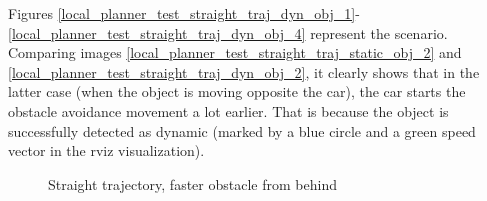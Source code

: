 Figures \ref{local_planner_test_straight_traj_dyn_obj_1}-\ref{local_planner_test_straight_traj_dyn_obj_4} represent the scenario. Comparing images \ref{local_planner_test_straight_traj_static_obj_2} and \ref{local_planner_test_straight_traj_dyn_obj_2}, it clearly shows that in the latter case (when the object is moving opposite the car), the car starts the obstacle avoidance movement a lot earlier. That is because the object is successfully detected as dynamic (marked by a blue circle and a green speed vector in the rviz visualization).

\begin{figure}[!ht]
	\centering




	\caption{Straight trajectory, faster obstacle from behind}
	\label{local_planner_test_straight_traj_faster_obj_from_behind}
\end{figure}

